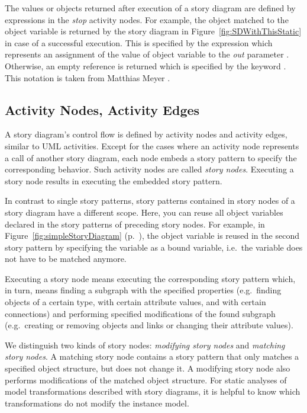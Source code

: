The values or objects returned after execution of a story diagram are defined by expressions in the \emph{stop} activity nodes.
For example, the object matched to the object variable  is returned by the story diagram in Figure~\ref{fig:SDWithThisStatic} in case of a successful execution.
This is specified by the expression  which represents an assignment of the value of object variable  to the \emph{out} parameter .
Otherwise, an empty reference is returned which is specified by the keyword .
This notation is taken from Matthias Meyer \cite{Mey09}.

\subsection{Activity Nodes, Activity Edges} \label{sec:storydiagrams:activitynodes}

A story diagram's control flow is defined by activity nodes and activity edges, similar to UML activities.
Except for the cases where an activity node represents a call of another story diagram,
each node embeds a story pattern to specify the corresponding behavior.
Such activity nodes are called \emph{story nodes}.
Executing a story node results in executing the embedded story pattern.

In contrast to single story patterns, story patterns contained in story nodes of a story diagram have a different scope.
Here, you can reuse all object variables declared in the story patterns of preceding story nodes.
For example, in Figure~\ref{fig:simpleStoryDiagram} (p.~\pageref{fig:simpleStoryDiagram}),
the object variable  is reused in the second story pattern
by specifying the variable as a bound variable, i.e.\ the variable does not have to be matched anymore.

Executing a story node means executing the corresponding story pattern
which, in turn, means finding a subgraph with the specified properties
(e.g.\ finding objects of a certain type, with certain attribute values, and with certain connections)
and performing specified modifications of the found subgraph
(e.g.\ creating or removing objects and links or changing their attribute values).

We distinguish two kinds of story nodes: \emph{modifying story nodes} and \emph{matching story nodes}.
A matching story node contains a story pattern that only matches a specified object structure, but does not change it.
A modifying story node also performs modifications of the matched object structure.
For static analyses of model transformations described with story diagrams,
it is helpful to know which transformations do not modify the instance model.

